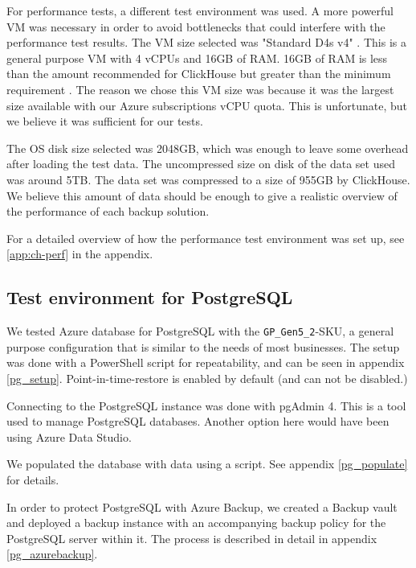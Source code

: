 For performance tests,
a different test environment was used.
A more powerful VM was necessary in order to 
avoid bottlenecks that could interfere with the performance test results.
The VM size selected was "Standard D4s v4" \cite{andysports8_dv4_nodate}.
This is a general purpose VM with 4 vCPUs and 16GB of RAM.
16GB of RAM is less than the amount recommended for ClickHouse \cite{noauthor_usage_nodate} but greater than the minimum requirement \cite{noauthor_requirements_nodate}.
The reason we chose this VM size was because it was the largest size available with our Azure subscriptions vCPU quota.
This is unfortunate, but we believe it was sufficient for our tests.

The OS disk size selected was 2048GB, which was enough to leave some overhead after loading the test data. The uncompressed size on disk of the data set used was around 5TB. The data set was compressed to a size of 955GB by ClickHouse. We believe this amount of data should be enough to give a realistic overview of the performance of each backup solution.

For a detailed overview of how the performance test environment was set up, 
see \ref{app:ch-perf} in the appendix.

\subsection{Test environment for PostgreSQL}
We tested Azure database for PostgreSQL with the \texttt{GP\_Gen5\_2}-SKU, a general purpose configuration that is similar to the needs of most businesses. The setup was done with a PowerShell script for repeatability, and can be seen in appendix \ref{pg_setup}. Point-in-time-restore is enabled by default (and can not be disabled.) 

Connecting to the PostgreSQL instance was done with pgAdmin 4.
This is a tool used to manage PostgreSQL databases.
Another option here would have been using Azure Data Studio.

We populated the database with data using a script.
See appendix \ref{pg_populate} for details.

In order to protect PostgreSQL with Azure Backup, we created a Backup vault and deployed a backup instance with an accompanying backup policy for the PostgreSQL server within it. 
The process is described in detail in appendix \ref{pg_azurebackup}. 

